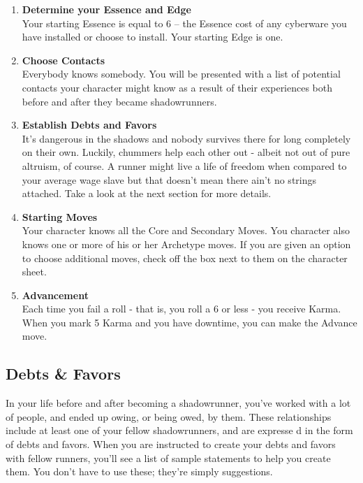 \begin{enumerate}
    \item \textbf{Determine your Essence and Edge} \\
    Your starting Essence is equal to 6 – the Essence cost of any cyberware you have installed or choose to install. Your starting Edge is one.
    
    \item \textbf{Choose Contacts} \\
    Everybody knows somebody. You will be presented with a list of potential contacts your character might know as a result of their experiences both before and after they became shadowrunners.
    
    \item \textbf{Establish Debts and Favors} \\
    It's dangerous in the shadows and nobody survives there for long completely on their own. Luckily, chummers help each other out - albeit not out of pure altruism, of course. A runner might live a life of freedom when compared to your average wage slave but that doesn't mean there ain't no strings attached. Take a look at the next section for more details.
    
    \item \textbf{Starting Moves} \\
    Your character knows all the Core and Secondary Moves. You character also knows one or more of his or her Archetype moves. If you are given an option to choose additional moves, check off the box next to them on the character sheet.
    
    \item \textbf{Advancement} \\
    Each time you fail a roll - that is, you roll a 6 or less - you receive Karma. When you mark 5 Karma and you have downtime, you can make the Advance move.
\end{enumerate}


\subsection{Debts \& Favors}
In your life before and after becoming a shadowrunner, you’ve worked with a lot of people, and ended up owing, or being owed, by them. These relationships include at least one of your fellow shadowrunners, and are expresse d in the form of debts and favors. When you are instructed to create your debts and favors with fellow runners, you’ll see a list of sample statements to help you create them. You don’t have to use these; they’re simply suggestions.
    
